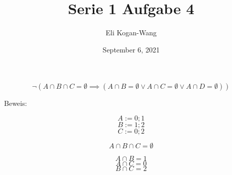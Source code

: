 \documentclass[a4paper,12pt]{article}
\title{Serie 1 Aufgabe 4}
\author{Eli Kogan-Wang}
\date{September 6, 2021}
\begin{document}
$$\neg(A\cap B\cap C=\emptyset\implies(A\cap B=\emptyset\lor A\cap C=\emptyset\lor A\cap D=\emptyset))$$

Beweis:

$$A:={0;1}$$
$$B:={1;2}$$
$$C:={0;2}$$

$$A\cap B\cap C=\emptyset$$

$$A\cap B={1}$$
$$A\cap C={0}$$
$$B\cap C={2}$$
\end{document}
